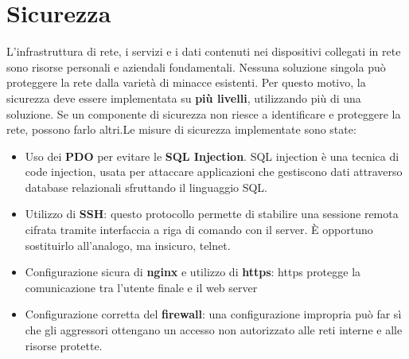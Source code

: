 
\section{Sicurezza}
L'infrastruttura di rete, i servizi e i dati contenuti nei dispositivi collegati in rete sono risorse personali e aziendali fondamentali. Nessuna soluzione singola può proteggere la rete dalla varietà di minacce esistenti. Per questo motivo, la sicurezza deve essere implementata su \textbf{più livelli}, utilizzando più di una soluzione. Se un componente di sicurezza non riesce a identificare e proteggere la rete, possono farlo altri.\clearpage Le misure di sicurezza implementate sono state:
\begin{itemize}
    \item Uso dei \textbf{PDO} per evitare le \textbf{SQL Injection}. SQL injection è una tecnica di code injection, usata per attaccare applicazioni che gestiscono dati attraverso database relazionali sfruttando il linguaggio SQL. \cite{sql_injection_php}
    \item Utilizzo di \textbf{SSH}: questo protocollo permette di stabilire una sessione remota cifrata tramite interfaccia a riga di comando con il server. È opportuno sostituirlo all'analogo, ma insicuro, telnet.
    \item Configurazione sicura di \textbf{nginx} e utilizzo di \textbf{https}: https protegge la comunicazione tra l'utente finale e il web server
    \item Configurazione corretta del \textbf{firewall}: una configurazione impropria può far sì che gli aggressori ottengano un accesso non autorizzato alle reti interne e alle risorse protette.
\end{itemize}

